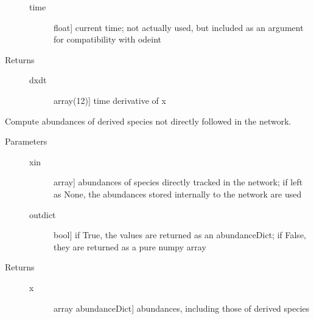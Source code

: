 \documentclass[letterpaper,10pt,english]{sphinxmanual}
\begin{document}
\begin{fulllineitems}
\begin{fulllineitems}
\begin{description}
\begin{description}
\item[{time}] \leavevmode{[}float{]}
current time; not actually used, but included as an
argument for compatibility with odeint

\end{description}

\item[{Returns}] \leavevmode\begin{description}
\item[{dxdt}] \leavevmode{[}array(12){]}
time derivative of x

\end{description}

\end{description}

\end{fulllineitems}


\begin{fulllineitems}
\label{fulldoc:despotic.chemistry.NL99_GC.extendAbundances}
Compute abundances of derived species not directly followed in
the network.
\begin{description}
\item[{Parameters}] \leavevmode\begin{description}
\item[{xin}] \leavevmode{[}array{]}
abundances of species directly tracked in the network;
if left as None, the abundances stored internally to the
network are used

\item[{outdict}] \leavevmode{[}bool{]}
if True, the values are returned as an abundanceDict; if
False, they are returned as a pure numpy array

\end{description}

\item[{Returns}] \leavevmode\begin{description}
\item[{x}] \leavevmode{[}array \textbar{} abundanceDict{]}
abundances, including those of derived species

\end{description}

\end{description}

\end{fulllineitems}


\end{fulllineitems}
\end{document}
